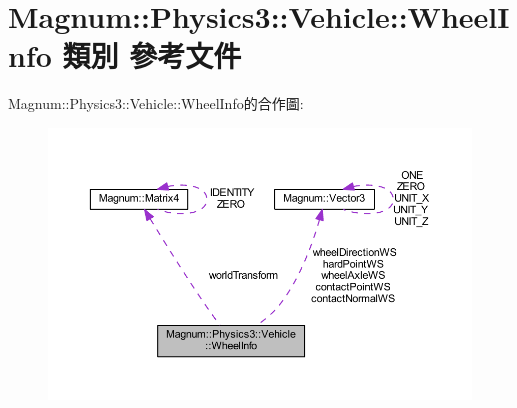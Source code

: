 \hypertarget{class_magnum_1_1_physics3_1_1_vehicle_1_1_wheel_info}{}\section{Magnum\+:\+:Physics3\+:\+:Vehicle\+:\+:Wheel\+Info 類別 參考文件}
\label{class_magnum_1_1_physics3_1_1_vehicle_1_1_wheel_info}


Magnum\+:\+:Physics3\+:\+:Vehicle\+:\+:Wheel\+Info的合作圖\+:\nopagebreak
\begin{figure}[H]
\begin{center}
\leavevmode
\includegraphics[width=350pt]{class_magnum_1_1_physics3_1_1_vehicle_1_1_wheel_info__coll__graph}
\end{center}
\end{figure}
